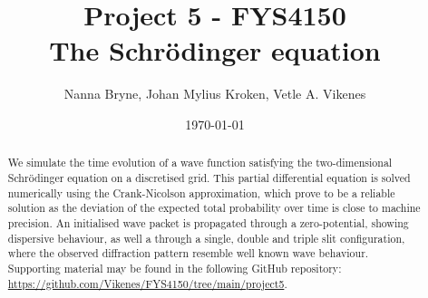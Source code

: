 



\title{Project 5 - FYS4150 \\
The Schrödinger equation
} 
\author{Nanna Bryne, Johan Mylius Kroken, Vetle A. Vikenes} 
\date{\today}                             
\noaffiliation                            

\begin{abstract}
    We simulate the time evolution of a wave function satisfying the two-dimensional Schrödinger equation on a discretised grid. This partial differential equation is solved numerically using the Crank-Nicolson approximation, which prove to be a reliable solution as the deviation of the expected total probability over time is close to machine precision. An initialised wave packet is propagated through a zero-potential, showing dispersive behaviour, as well a through a single, double and triple slit configuration, where the observed diffraction pattern resemble well known wave behaviour. \\
    Supporting material may be found in the following GitHub repository: \url{https://github.com/Vikenes/FYS4150/tree/main/project5}.
\end{abstract}
\maketitle






% 















